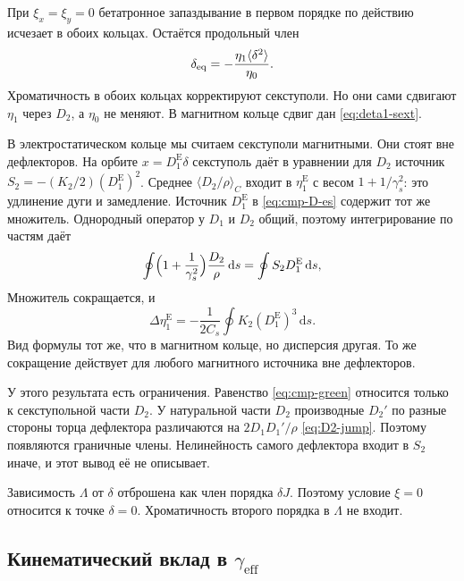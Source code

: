 При $\xi_x=\xi_y=0$ бетатронное запаздывание в первом порядке по действию исчезает в обоих кольцах. Остаётся продольный член
\begin{equation}
\label{eq:cmp-deq-xi0}
\delta_{\mathrm{eq}}=-\frac{\eta_1\langle\delta^2\rangle}{\eta_0}.
\end{equation}
Хроматичность в обоих кольцах корректируют секступоли. Но они сами сдвигают $\eta_1$ через $D_2$, а $\eta_0$ не меняют. В магнитном кольце сдвиг дан \eqref{eq:deta1-sext}.

В электростатическом кольце мы считаем секступоли магнитными. Они стоят вне дефлекторов. На орбите $x=D_1^{\mathrm{E}}\delta$ секступоль даёт в уравнении для $D_2$ источник $S_2=-(K_2/2)(D_1^{\mathrm{E}})^2$. Среднее $\langle D_2/\rho\rangle_C$ входит в $\eta_1^{\mathrm{E}}$ с весом $1+1/\gamma_s^2$: это удлинение дуги и замедление. Источник $D_1^{\mathrm{E}}$ в \eqref{eq:cmp-D-es} содержит тот же множитель. Однородный оператор у $D_1$ и $D_2$ общий, поэтому интегрирование по частям даёт
\begin{equation}
\label{eq:cmp-green}
\oint\Bigl(1+\frac{1}{\gamma_s^2}\Bigr)\frac{D_2}{\rho}\,\mathrm{d}s
=\oint S_2 D_1^{\mathrm{E}}\,\mathrm{d}s,
\end{equation}
Множитель сокращается, и
\begin{equation}
\label{eq:cmp-deta1-es}
\Delta\eta_1^{\mathrm{E}}
=-\frac{1}{2C_s}\oint K_2 (D_1^{\mathrm{E}})^3\,\mathrm{d}s.
\end{equation}
Вид формулы тот же, что в магнитном кольце, но дисперсия другая. То же сокращение действует для любого магнитного источника вне дефлекторов.

У этого результата есть ограничения. Равенство \eqref{eq:cmp-green} относится только к секступольной части $D_2$. У натуральной части $D_2$ производные $D_2'$ по разные стороны торца дефлектора различаются на $2D_1D_1'/\rho$ \eqref{eq:D2-jump}. Поэтому появляются граничные члены. Нелинейность самого дефлектора входит в $S_2$ иначе, и этот вывод её не описывает.

Зависимость $\Lambda$ от $\delta$ отброшена как член порядка $\delta J$. Поэтому условие $\xi=0$ относится к точке $\delta=0$. Хроматичность второго порядка в $\Lambda$ не входит.

\subsection{Кинематический вклад в $\gamma_{\mathrm{eff}}$}

